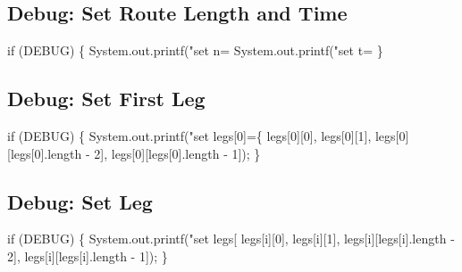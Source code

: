\subsection{Debug: Set Route Length and Time}

\nwenddocs{}\endmoddef\nwstartdeflinemarkup{}\nwenddeflinemarkup
if (DEBUG) \{
  System.out.printf("set n=%
  System.out.printf("set t=%
\}
\nwendcode{}\nwdocspar

\subsection{Debug: Set First Leg}

\nwenddocs{}\endmoddef\nwstartdeflinemarkup{}\nwenddeflinemarkup
if (DEBUG) \{
  System.out.printf("set legs[0]=\{ %
      legs[0][0], legs[0][1], legs[0][legs[0].length - 2], legs[0][legs[0].length - 1]);
\}
\nwendcode{}\nwdocspar

\subsection{Debug: Set Leg}

\nwenddocs{}\endmoddef\nwstartdeflinemarkup{}\nwenddeflinemarkup
if (DEBUG) \{
  System.out.printf("set legs[%
      legs[i][0], legs[i][1], legs[i][legs[i].length - 2], legs[i][legs[i].length - 1]);
\}
\nwendcode{}\nwdocspar

